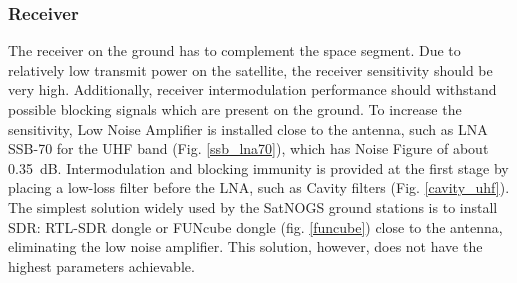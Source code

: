 \subsubsection{Receiver}
The receiver on the ground has to complement the space segment. Due to relatively low transmit power on the satellite, the receiver sensitivity should be very high. Additionally, receiver intermodulation performance should withstand possible blocking signals which are present on the ground. To increase the sensitivity, Low Noise Amplifier is installed close to the antenna, such as LNA SSB-70 for the UHF band (Fig. \ref{ssb_lna70}), which has Noise Figure of about \SI{0.35}{\dB}. Intermodulation and blocking immunity is provided at the first stage by placing a low-loss filter before the LNA, such as Cavity filters (Fig. \ref{cavity_uhf}). The simplest solution widely used by the SatNOGS ground stations is to install SDR: RTL-SDR dongle or FUNcube dongle (fig. \ref{funcube}) close to the antenna, eliminating the low noise amplifier. This solution, however, does not have the highest parameters achievable.

